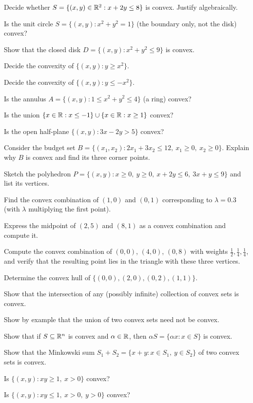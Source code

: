 \begin{problems}
  \item Decide whether $S=\{(x,y)\in\mathbb{R}^{2}: x+2y\le 8\}$ is convex. Justify
        algebraically.
  \item Is the unit circle $S=\{(x,y): x^{2}+y^{2}=1\}$ (the boundary only,
        not the disk) convex?
  \item Show that the closed disk $D=\{(x,y): x^{2}+y^{2}\le 9\}$ is convex.
  \item Decide the convexity of $\{(x,y): y\ge x^{2}\}$.
  \item Decide the convexity of $\{(x,y): y\le -x^{2}\}$.
  \item Is the annulus $A=\{(x,y): 1\le x^{2}+y^{2}\le 4\}$ (a ring) convex?
  \item Is the union $\{x\in\mathbb{R}: x\le -1\}\cup\{x\in\mathbb{R}: x\ge 1\}$ convex?
  \item Is the open half-plane $\{(x,y): 3x-2y>5\}$ convex?
  \item Consider the budget set
        $B=\{(x_{1},x_{2}): 2x_{1}+3x_{2}\le 12,\ x_{1}\ge 0,\ x_{2}\ge 0\}$.
        Explain why $B$ is convex and find its three corner points.
  \item Sketch the polyhedron
        $P=\{(x,y): x\ge 0,\ y\ge 0,\ x+2y\le 6,\ 3x+y\le 9\}$ and list its
        vertices.
  \item Find the convex combination of $(1,0)$ and $(0,1)$ corresponding to
        $\lambda=0.3$ (with $\lambda$ multiplying the first point).
  \item Express the midpoint of $(2,5)$ and $(8,1)$ as a convex combination
        and compute it.
  \item Compute the convex combination of $(0,0)$, $(4,0)$, $(0,8)$ with
        weights $\tfrac12,\tfrac14,\tfrac14$, and verify that the resulting
        point lies in the triangle with these three vertices.
  \item Determine the convex hull of $\{(0,0),(2,0),(0,2),(1,1)\}$.
  \item Show that the intersection of any (possibly infinite) collection of
        convex sets is convex.
  \item Show by example that the union of two convex sets need not be
        convex.
  \item Show that if $S\subseteq\mathbb{R}^{n}$ is convex and $\alpha\in\mathbb{R}$, then
        $\alpha S=\{\alpha x : x\in S\}$ is convex.
  \item Show that the Minkowski sum
        $S_{1}+S_{2}=\{x+y : x\in S_{1},\ y\in S_{2}\}$ of two convex sets
        is convex.
  \item Is $\{(x,y): xy\ge 1,\ x>0\}$ convex?
  \item Is $\{(x,y): xy\le 1,\ x>0,\ y>0\}$ convex?
\end{problems}

